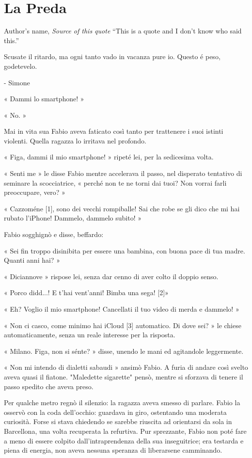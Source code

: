 \chapter{La Preda}

\begin{chapquote}{Author's name, \textit{Source of this quote}}
``This is a quote and I don't know who said this.''
\end{chapquote}


Scusate il ritardo, ma ogni tanto vado in vacanza pure io. Questo é peso, godetevelo.

- Simone

« Dammi lo smartphone! »

« No. »

Mai in vita sua Fabio aveva faticato così tanto per trattenere i suoi istinti violenti. Quella ragazza lo irritava nel profondo.

« Figa, dammi il mio smartphone! » ripeté lei, per la sedicesima volta.

« Senti me » le disse Fabio mentre accelerava il passo, nel disperato tentativo di seminare la scocciatrice, « perché non te ne torni dai tuoi? Non vorrai farli preoccupare, vero? »

« Cazzoméne [1], sono dei vecchi rompiballe! Sai che robe se gli dico che mi hai rubato l'iPhone! Dammelo, dammelo subito! »

Fabio sogghignò e disse, beffardo:

« Sei fin troppo disinibita per essere una bambina, con buona pace di tua madre. Quanti anni hai? »

« Diciannove » rispose lei, senza dar cenno di aver colto il doppio senso.

« Porco didd...! E t'hai vent'anni! Bimba una sega! [2]»

« Eh? Voglio il mio smartphone! Cancellati il tuo video di merda e dammelo! »

« Non ci casco, come minimo hai iCloud [3] automatico. Di dove sei? » le chiese automaticamente, senza un reale interesse per la risposta.

« Milano. Figa, non si sénte? » disse, unendo le mani ed agitandole leggermente.

« Non mi intendo di dialetti sabaudi » ansimò Fabio. A furia di andare così svelto aveva quasi il fiatone. "Maledette sigarette" pensò, mentre si sforzava di tenere il passo spedito che aveva preso.

Per qualche metro regnò il silenzio: la ragazza aveva smesso di parlare. Fabio la osservò con la coda dell'occhio: guardava in giro, ostentando una moderata curiosità. Forse si stava chiedendo se sarebbe riuscita ad orientarsi da sola in Barcellona, una volta recuperata la refurtiva. Pur sprezzante, Fabio non poté fare a meno di essere colpito dall'intraprendenza della sua inseguitrice; era testarda e piena di energia, non aveva nessuna speranza di liberarsene camminando.

